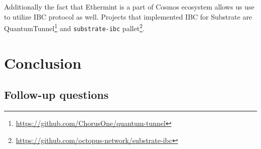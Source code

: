 \documentclass{article}
\begin{document}
Additionally the fact that Ethermint is a part of Cosmos ecosystem allows us use to utilize IBC protocol as well. Projects that implemented IBC for Substrate are QuantumTunnel\footnote{\url{https://github.com/ChorusOne/quantum-tunnel}} and \texttt{substrate-ibc} pallet\footnote{\url{https://github.com/octopus-network/substrate-ibc}}.


\section{Conclusion}

\subsection{Follow-up questions}



\end{document}
